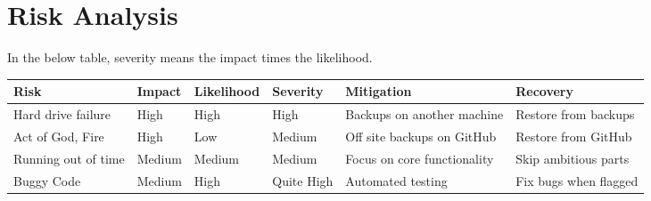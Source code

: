 \section{Risk Analysis}

In the below table, severity means the impact times the likelihood.

\begin{adjustwidth}{-7.5em}{}

\begin{center}
    \begin{tabular}{l l l l l l}
    \toprule
    Risk                & Impact    & Likelihood    & Severity      & Mitigation                    & Recovery              \\
    \midrule
    Hard drive failure  & High      & High          & High          & Backups on another machine    & Restore from backups  \\ \addlinespace
    Act of God, Fire    & High      & Low           & Medium        & Off site backups on GitHub    & Restore from GitHub   \\ \addlinespace
    Running out of time & Medium    & Medium        & Medium        & Focus on core functionality   & Skip ambitious parts  \\ \addlinespace
    Buggy Code          & Medium    & High          & Quite High    & Automated testing             & Fix bugs when flagged \\
    \bottomrule
    \end{tabular}
\end{center}

\end{adjustwidth}
